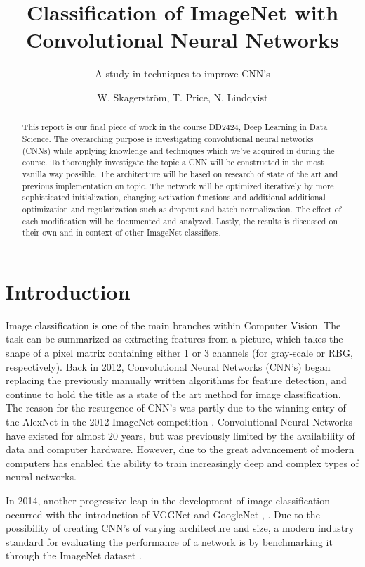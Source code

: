 \documentclass{kthreport}
\title{Classification of ImageNet with Convolutional Neural Networks}
\subtitle{A study in techniques to improve CNN's}
\author{W. Skagerström, T. Price, N. Lindqvist}
\begin{document}
\maketitle
\newpage
\begin{abstract}

\noindent
This report is our final piece of work in the course DD2424, Deep Learning in Data Science. The overarching purpose is investigating convolutional neural networks (CNNs) while applying knowledge and techniques which we've acquired in during the course.
\noindent
To thoroughly investigate the topic a CNN will be constructed in the most vanilla way possible. The architecture will be based on research of state of the art and previous implementation on topic. The network will be optimized iteratively by more sophisticated initialization, changing activation functions and additional additional optimization and regularization such as dropout and batch normalization. The effect of each modification will be documented and analyzed. Lastly, the results is discussed on their own and in context of other ImageNet classifiers.
\end{abstract}
\newpage

\tableofcontents
\newpage

\section{Introduction}
Image classification is one of the main branches within Computer Vision. The task can be summarized as extracting features from a picture, which takes the shape of a pixel matrix containing either 1 or 3 channels (for gray-scale or RBG, respectively). Back in 2012, Convolutional Neural Networks (CNN's) began replacing the previously manually written algorithms for feature detection, and continue to hold the title as a state of the art method for image classification. The reason for the resurgence of CNN's was partly due to the winning entry of the AlexNet in the 2012 ImageNet competition \cite{krizhevsky2012imagenet}. Convolutional Neural Networks have existed for almost 20 years, but was previously limited by the availability of data and computer hardware. However, due to the great advancement of modern computers has enabled the ability to train increasingly deep and complex types of neural networks. 

In 2014, another progressive leap in the development of image classification occurred with the introduction of VGGNet and GoogleNet \cite{simonyan2014very}, \cite{szegedy2016rethinking}.  Due to the possibility of creating CNN's of varying architecture and size, a modern industry standard for evaluating the performance of a network is by benchmarking it through the ImageNet dataset \cite{russakovsky2015imagenet}.
\end{document}
